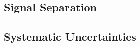 \documentclass[12pt]{article}
\begin{document}
%




\subsection{Signal Separation}%
\label{sec:signal_separation}




\subsection{Systematic Uncertainties}%
\label{sec:systematics}





%










\newpage
\def\bibfont{\footnotesize}
\setlength{\bibsep}{1pt}




\end{document}
